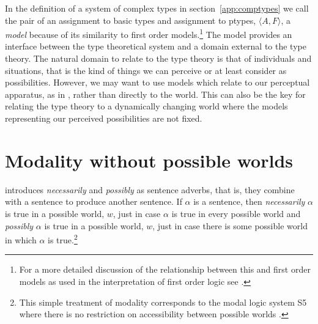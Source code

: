 In the definition of a system of complex types in
section~\ref{app:comptypes}  we call the pair of an assignment to
basic types and assignment to ptypes, $\langle A,F\rangle$, a \textit{model} because of its
similarity to first order models.\footnote{For a more detailed
  discussion of the relationship between this and first order models
  as used in the interpretation of first order logic see
  \cite{Cooperforthcoming}.} The model provides an interface
between 
the type theoretical system and a domain external to the type theory.
The natural domain to relate to the type theory is that of individuals
and situations, that is the kind of things we can perceive or at least
consider as possibilities.  However, we may want to use models which
relate to our perceptual apparatus, as in \cite{Larsson2011}, rather
than directly to the world.  This can also be the key for relating the
type theory to a dynamically changing world where the models
representing our perceived possibilities are not fixed.  %





\section{Modality without possible worlds}

\cite{Montague1973} introduces \textit{necessarily} and
\textit{possibly} as sentence adverbs, that is, they combine with a
sentence to produce another sentence. If $\alpha$ is a sentence, then
\textit{necessarily} $\alpha$ is true in a possible world, $w$, just in case $\alpha$ is true in
every possible world and \textit{possibly} $\alpha$ is true in a
possible world, $w$, just in case there is some possible world in
which $\alpha$ is true.\footnote{This simple treatment of modality
  corresponds to the modal logic system S5 where there is no
  restriction on accessibility between possible worlds
  \citep{HughesCresswel1968,HughesCresswell1996}.}

